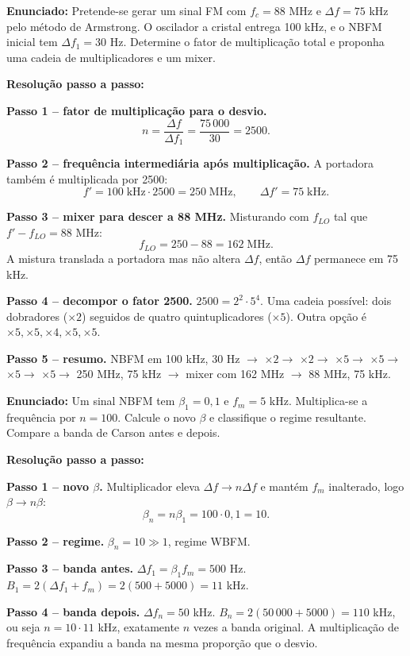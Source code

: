\documentclass[11pt,a4paper]{article}
\begin{document}
\begin{exercicio}
\textbf{Enunciado:} Pretende-se gerar um sinal FM com $f_c=88$ MHz e $\Delta f=75$ kHz pelo método de Armstrong. O oscilador a cristal entrega 100 kHz, e o NBFM inicial tem $\Delta f_1=30$ Hz. Determine o fator de multiplicação total e proponha uma cadeia de multiplicadores e um mixer.

\textbf{Resolução passo a passo:}

\textbf{Passo 1 -- fator de multiplicação para o desvio.}
\[
  n = \frac{\Delta f}{\Delta f_1} = \frac{75\,000}{30} = 2500.
\]

\textbf{Passo 2 -- frequência intermediária após multiplicação.}
A portadora também é multiplicada por 2500:
\[
  f' = 100\;\text{kHz}\!\cdot\!2500 = 250\;\text{MHz}, \qquad \Delta f' = 75\;\text{kHz}.
\]

\textbf{Passo 3 -- mixer para descer a 88 MHz.}
Misturando com $f_{LO}$ tal que $f' - f_{LO} = 88$ MHz:
\[
  f_{LO} = 250 - 88 = 162\;\text{MHz}.
\]
A mistura translada a portadora mas não altera $\Delta f$, então $\Delta f$ permanece em 75 kHz.

\textbf{Passo 4 -- decompor o fator 2500.}
$2500 = 2^2\!\cdot\!5^4$. Uma cadeia possível: dois dobradores ($\times 2$) seguidos de quatro quintuplicadores ($\times 5$). Outra opção é $\times 5,\times 5,\times 4,\times 5,\times 5$.

\textbf{Passo 5 -- resumo.}
NBFM em 100 kHz, 30 Hz $\to$ $\times 2 \to$ $\times 2 \to$ $\times 5 \to$ $\times 5 \to$ $\times 5 \to$ $\times 5 \to$ 250 MHz, 75 kHz $\to$ mixer com 162 MHz $\to$ 88 MHz, 75 kHz.
\end{exercicio}

\begin{exercicio}
\textbf{Enunciado:} Um sinal NBFM tem $\beta_1=0{,}1$ e $f_m=5$ kHz. Multiplica-se a frequência por $n=100$. Calcule o novo $\beta$ e classifique o regime resultante. Compare a banda de Carson antes e depois.

\textbf{Resolução passo a passo:}

\textbf{Passo 1 -- novo $\beta$.}
Multiplicador eleva $\Delta f \to n\Delta f$ e mantém $f_m$ inalterado, logo $\beta \to n\beta$:
\[
  \beta_n = n\beta_1 = 100\!\cdot\!0{,}1 = 10.
\]

\textbf{Passo 2 -- regime.}
$\beta_n = 10 \gg 1$, regime WBFM.

\textbf{Passo 3 -- banda antes.}
$\Delta f_1 = \beta_1 f_m = 500$ Hz. $B_1 = 2(\Delta f_1 + f_m) = 2(500 + 5000) = 11$ kHz.

\textbf{Passo 4 -- banda depois.}
$\Delta f_n = 50$ kHz. $B_n = 2(50\,000 + 5000) = 110$ kHz, ou seja $n=10\!\cdot\!11$ kHz, exatamente $n$ vezes a banda original. A multiplicação de frequência expandiu a banda na mesma proporção que o desvio.
\end{exercicio}
\end{document}

